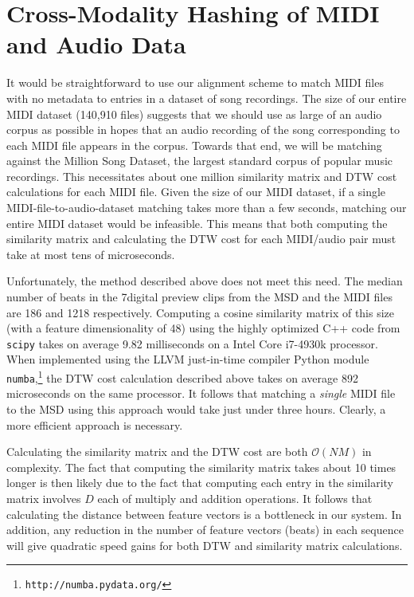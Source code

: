 \documentclass{article}
\begin{document}
\section{Cross-Modality Hashing of MIDI and Audio Data}
\label{sec:hashing}

It would be straightforward to use our alignment scheme to match MIDI files with no metadata to entries in a dataset of song recordings.
The size of our entire MIDI dataset (140,910 files) suggests that we should use as large of an audio corpus as possible in hopes that an audio recording of the song corresponding to each MIDI file appears in the corpus.
Towards that end, we will be matching against the Million Song Dataset, the largest standard corpus of popular music recordings.
This necessitates about one million similarity matrix and DTW cost calculations for each MIDI file.
Given the size of our MIDI dataset, if a single MIDI-file-to-audio-dataset matching takes more than a few seconds, matching our entire MIDI dataset would be infeasible.
This means that both computing the similarity matrix and calculating the DTW cost for each MIDI/audio pair must take at most tens of microseconds.

Unfortunately, the method described above does not meet this need.
The median number of beats in the 7digital preview clips from the MSD and the MIDI files are 186 and 1218 respectively.
Computing a cosine similarity matrix of this size (with a feature dimensionality of 48) using the highly optimized C++ code from \texttt{scipy} \cite{jones2014scipy} takes on average 9.82 milliseconds on a Intel Core i7-4930k processor.
When implemented using the LLVM just-in-time compiler Python module \texttt{numba},\footnote{\texttt{http://numba.pydata.org/}} the DTW cost calculation described above takes on average 892 microseconds on the same processor.
It follows that matching a \textit{single} MIDI file to the MSD using this approach would take just under three hours.
Clearly, a more efficient approach is necessary.

Calculating the similarity matrix and the DTW cost are both $\mathcal{O}(NM)$ in complexity.
The fact that computing the similarity matrix takes about 10 times longer is then likely due to the fact that computing each entry in the similarity matrix involves $D$ each of multiply and addition operations.
It follows that calculating the distance between feature vectors is a bottleneck in our system.
In addition, any reduction in the number of feature vectors (beats) in each sequence will give quadratic speed gains for both DTW and similarity matrix calculations.
\end{document}
